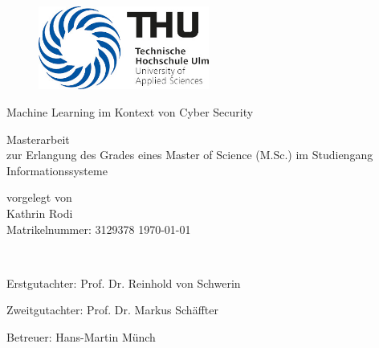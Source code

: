 \documentclass[
    12pt, %
    DIV10,
    ngerman, %
    a4paper, %
    oneside, %
    titlepage, %
    parskip=half, %
    headings=normal, %
    listof=totoc, %
    bibliography=totoc, %
    index=totoc, %
    captions=tableheading, %
    final %
]{scrreprt}
\begin{document}
\setcounter{secnumdepth}{3}
\setcounter{tocdepth}{3}

\begin{titlepage} 
	\newcommand{\HRule}{\rule{\linewidth}{1.5mm}} 
	\center
	\begin{figure}
	\centering
	\includegraphics[width=0.5\textwidth]{img/logo}
	\label{pic:Logo}
	\end{figure}
	
	 
	
	\begin{center}
	\end{center}

		{\huge Machine Learning im Kontext von Cyber Security}\\[0.4cm]
\begin{center}
\end{center}
		{\Large Masterarbeit}\\ 
		{zur Erlangung des Grades eines Master of Science (M.Sc.) im Studiengang Informationssysteme}
\vfill
\begin{center}
		{vorgelegt von}\ \\
\vspace{0.25\baselineskip}
		{\Large Kathrin Rodi}\ \\
\vfill
\vspace{0.25\baselineskip}
		{\Large Matrikelnummer: 3129378}
		\vfill			
{\Large \today} 
\end{center}	
\\[\baselineskip]
\vfill	
\begin{center}
{\large Erstgutachter: Prof. Dr. Reinhold von Schwerin}\\	
\end{center}
\begin{center}
{\large Zweitgutachter: Prof. Dr. Markus Schäffter}
\end{center}
\begin{center}
{\large Betreuer: Hans-Martin Münch}
\end{center}
	
\end{titlepage}
\end{document}

